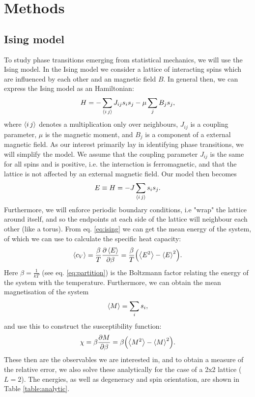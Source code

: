 \section{Methods}
\label{sec:methods}

\subsection{Ising model}
\label{sec:ising}
To study phase transitions emerging from statistical mechanics, we will use the Ising model. In the Ising model we consider a lattice of interacting spins which are influenced by each other and an magnetic field $B$. In general then, we can express the Ising model as an Hamiltonian:
  \begin{equation}
  \label{eq:isingH}
    H = -\sum_{\expval{i\, j}}J_{ij}s_i s_j - \mu\sum_j B_js_j,
  \end{equation}
where $\expval{i\,j}$ denotes a multiplication only over neighbours, $J_{ij}$ is a coupling parameter, $\mu$ is the magnetic moment, and $B_j$ is a component of a external magnetic field. As our interest primarily lay in identifying phase transitions, we will simplify the model. We assume that the coupling parameter $J_{ij}$ is the same for all spins and is positive, i.e. the interaction is ferromagnetic, and that the lattice is not affected by an external magnetic field. Our model then becomes
  \begin{equation}
  \label{eq:ising}
    E \equiv H = -J\sum_{\expval{i\, j}}s_i s_j.
  \end{equation}
Furthermore, we will enforce periodic boundary conditions, i.e "wrap" the lattice around itself, and so the endpoints at each side of the lattice will neighbour each other (like a torus).
From eq. \ref{eq:ising} we can get the mean energy of the system, of which we can use to calculate the specific heat capacity:
  \begin{equation}
    \label{eq:energy}
    \expval{c_V} = \frac{\beta}{T}\pdv{\expval{E}}{\beta} = \frac{\beta}{T}\qty(\expval{E^2} - \expval{E}^2).
  \end{equation}
Here $\beta = \frac{1}{kT}$ (see eq. \ref{eq:partition}) is the Boltzmann factor relating the energy of the system with the temperature. Furthermore, we can obtain the mean magnetisation of the system
  \begin{equation}
  \label{eq:magnet}
    \expval{M} = \sum_i s_i,
  \end{equation}
and use this to construct the susceptibility function:
  \begin{equation}
  \label{eq:suscept}
    \chi = \beta \pdv{M}{\beta} = \beta \qty(\expval{M^2} - \expval{M}^2).
  \end{equation}
These then are the observables we are interested in, and to obtain a measure of the relative error, we also solve these analytically for the case of a 2x2 lattice ($L=2$). The energies, as well as degeneracy and spin orientation, are shown in Table \ref{table:analytic}.

